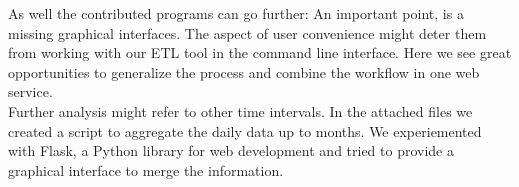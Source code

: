 \documentclass[conference, 11pt]{IEEEtran}
\begin{document}
\break
As well the contributed programs can go further: An important point, is a missing graphical interfaces. The aspect of user convenience might deter them from working with our ETL tool in the command line interface. Here we see great opportunities to generalize the process and combine the workflow in one web service.\\
Further analysis might refer to other time intervals. In the attached files we created a script to aggregate the daily data up to months.
We experiemented with Flask, a Python library for web development \cite{Flask} and tried to provide a graphical interface to merge the information.


\end{document}
